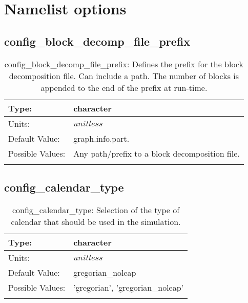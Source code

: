 \chapter[Namelist options]{Namelist options}
\label{chap:namelist_sections}
\section[config\_block\_decomp\_file\_prefix]{config\_block\_decomp\_file\_prefix}
\label{sec:nm_sec_config_block_decomp_file_prefix}
\begin{center}
\begin{longtable}{| p{2.0in} || p{4.0in} |}
    \hline
    Type: & character \\
    \hline
    Units: & $unitless$ \\
    \hline
    Default Value: & graph.info.part. \\
    \hline
    Possible Values: & Any path/prefix to a block decomposition file. \\
    \hline
    \caption{config\_block\_decomp\_file\_prefix: Defines the prefix for the block decomposition file. Can include a path. The number of blocks is appended to the end of the prefix at run-time.}
\end{longtable}
\end{center}
\section[config\_calendar\_type]{config\_calendar\_type}
\label{sec:nm_sec_config_calendar_type}
\begin{center}
\begin{longtable}{| p{2.0in} || p{4.0in} |}
    \hline
    Type: & character \\
    \hline
    Units: & $unitless$ \\
    \hline
    Default Value: & gregorian\_noleap \\
    \hline
    Possible Values: & 'gregorian', 'gregorian\_noleap' \\
    \hline
    \caption{config\_calendar\_type: Selection of the type of calendar that should be used in the simulation.}
\end{longtable}
\end{center}
